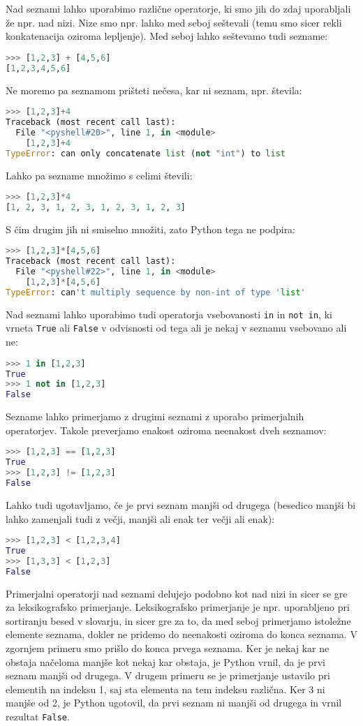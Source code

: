 Nad seznami lahko uporabimo različne operatorje, ki smo jih do zdaj uporabljali že npr. nad nizi. Nize smo npr. lahko med seboj seštevali (temu smo sicer rekli konkatenacija oziroma lepljenje). Med seboj lahko seštevamo tudi sezname:
\begin{lstlisting}[language=Python]
>>> [1,2,3] + [4,5,6]
[1,2,3,4,5,6]
\end{lstlisting}
Ne moremo pa seznamom prišteti nečesa, kar ni seznam, npr. števila:
\begin{lstlisting}[language=Python]
>>> [1,2,3]+4
Traceback (most recent call last):
  File "<pyshell#20>", line 1, in <module>
    [1,2,3]+4
TypeError: can only concatenate list (not "int") to list
\end{lstlisting}
Lahko pa sezname množimo s celimi števili:
\begin{lstlisting}[language=Python]
>>> [1,2,3]*4
[1, 2, 3, 1, 2, 3, 1, 2, 3, 1, 2, 3]
\end{lstlisting}
S čim drugim jih ni smiselno množiti, zato Python tega ne podpira:
\begin{lstlisting}[language=Python]
>>> [1,2,3]*[4,5,6]
Traceback (most recent call last):
  File "<pyshell#22>", line 1, in <module>
    [1,2,3]*[4,5,6]
TypeError: can't multiply sequence by non-int of type 'list'
\end{lstlisting}

Nad seznami lahko uporabimo tudi operatorja vsebovanosti \texttt{in} in \texttt{not in}, ki vrneta \texttt{True} ali \texttt{False} v odvisnosti od tega ali je nekaj v seznamu vsebovano ali ne:
\begin{lstlisting}[language=Python]
>>> 1 in [1,2,3]
True
>>> 1 not in [1,2,3]
False
\end{lstlisting}

Sezname lahko primerjamo z drugimi seznami z uporabo primerjalnih operatorjev. Takole preverjamo enakost oziroma neenakost dveh seznamov:
\begin{lstlisting}[language=Python]
>>> [1,2,3] == [1,2,3]
True
>>> [1,2,3] != [1,2,3]
False
\end{lstlisting}
Lahko tudi ugotavljamo, če je prvi seznam manjši od drugega (besedico manjši bi lahko zamenjali tudi z večji, manjši ali enak ter večji ali enak):
\begin{lstlisting}[language=Python]
>>> [1,2,3] < [1,2,3,4]
True
>>> [1,3,3] < [1,2,3]
False
\end{lstlisting}
Primerjalni operatorji nad seznami delujejo podobno kot nad nizi in sicer se gre za leksikografsko primerjanje. Leksikografsko primerjanje je npr. uporabljeno pri sortiranju besed v slovarju, in sicer gre za to, da med seboj primerjamo istoležne elemente seznama, dokler ne pridemo do neenakosti oziroma do konca seznama. V zgornjem primeru smo prišlo do konca prvega seznama. Ker je nekaj kar ne obstaja načeloma manjše kot nekaj kar obstaja, je Python vrnil, da je prvi seznam manjši od drugega. V drugem primeru se je primerjanje ustavilo pri elementih na indeksu 1, saj sta elementa na tem indeksu različna. Ker 3 ni manjše od 2, je Python ugotovil, da prvi seznam ni manjši od drugega in vrnil rezultat \texttt{False}.

